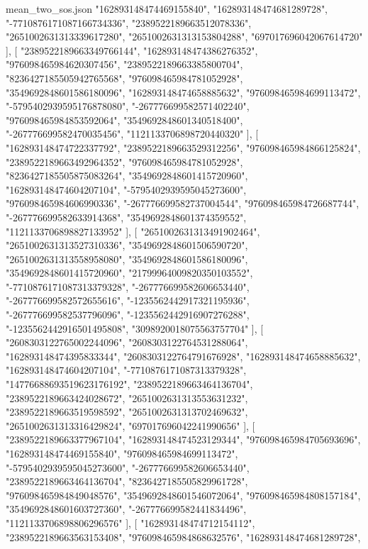 \begin{filecontents*}[overwrite]{mean_two_sos.json}
    "162893148474469155840",
    "162893148474681289728",
    "-7710876171087166734336",
    "2389522189663512078336",
    "2651002631313339617280",
    "2651002631313153804288",
    "697017696042067614720"
   ],
   [
    "2389522189663349766144",
    "162893148474386276352",
    "976098465984620307456",
    "2389522189663385800704",
    "8236427185505942765568",
    "976098465984781052928",
    "3549692848601586180096",
    "162893148474658885632",
    "976098465984699113472",
    "-5795402939595176878080",
    "-267776699582571402240",
    "976098465984853592064",
    "3549692848601340518400",
    "-267776699582470035456",
    "1121133706898720440320"
   ],
   [
    "162893148474722337792",
    "2389522189663529312256",
    "976098465984866125824",
    "2389522189663492964352",
    "976098465984781052928",
    "8236427185505875083264",
    "3549692848601415720960",
    "162893148474604207104",
    "-5795402939595045273600",
    "976098465984606990336",
    "-267776699582737004544",
    "976098465984726687744",
    "-267776699582633914368",
    "3549692848601374359552",
    "1121133706898827133952"
   ],
   [
    "2651002631313491902464",
    "2651002631313527310336",
    "3549692848601506590720",
    "2651002631313558958080",
    "3549692848601586180096",
    "3549692848601415720960",
    "21799964009820350103552",
    "-7710876171087313379328",
    "-267776699582606653440",
    "-267776699582572655616",
    "-1235562442917321195936",
    "-267776699582537796096",
    "-1235562442916907276288",
    "-1235562442916501495808",
    "3098920018075563757704"
   ],
   [
    "2608303122765002244096",
    "2608303122764531288064",
    "162893148474395833344",
    "2608303122764791676928",
    "162893148474658885632",
    "162893148474604207104",
    "-7710876171087313379328",
    "14776688693519623176192",
    "2389522189663464136704",
    "2389522189663424028672",
    "2651002631313553631232",
    "2389522189663519598592",
    "2651002631313702469632",
    "2651002631313316429824",
    "697017696042241990656"
   ],
   [
    "2389522189663377967104",
    "162893148474523129344",
    "976098465984705693696",
    "162893148474469155840",
    "976098465984699113472",
    "-5795402939595045273600",
    "-267776699582606653440",
    "2389522189663464136704",
    "8236427185505829961728",
    "976098465984849048576",
    "3549692848601546072064",
    "976098465984808157184",
    "3549692848601603727360",
    "-267776699582441834496",
    "1121133706898806296576"
   ],
   [
    "162893148474712154112",
    "2389522189663563153408",
    "976098465984868632576",
    "162893148474681289728",

\end{filecontents*}
